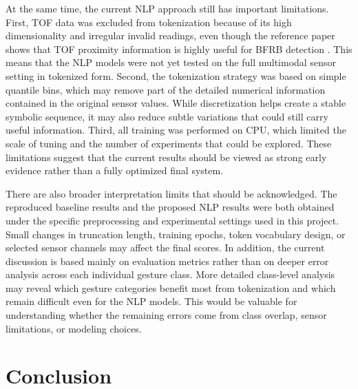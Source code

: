 \documentclass[conference]{IEEEtran}
\begin{document}
At the same time, the current NLP approach still has important limitations. First, TOF data was excluded from tokenization because of its high dimensionality and irregular invalid readings, even though the reference paper shows that TOF proximity information is highly useful for BFRB detection \cite{zhang2025detection}. This means that the NLP models were not yet tested on the full multimodal sensor setting in tokenized form. Second, the tokenization strategy was based on simple quantile bins, which may remove part of the detailed numerical information contained in the original sensor values. While discretization helps create a stable symbolic sequence, it may also reduce subtle variations that could still carry useful information. Third, all training was performed on CPU, which limited the scale of tuning and the number of experiments that could be explored. These limitations suggest that the current results should be viewed as strong early evidence rather than a fully optimized final system.

There are also broader interpretation limits that should be acknowledged. The reproduced baseline results and the proposed NLP results were both obtained under the specific preprocessing and experimental settings used in this project. Small changes in truncation length, training epochs, token vocabulary design, or selected sensor channels may affect the final scores. In addition, the current discussion is based mainly on evaluation metrics rather than on deeper error analysis across each individual gesture class. More detailed class-level analysis may reveal which gesture categories benefit most from tokenization and which remain difficult even for the NLP models. This would be valuable for understanding whether the remaining errors come from class overlap, sensor limitations, or modeling choices.

\section{Conclusion}
\label{sec:conclusion}
\end{document}
